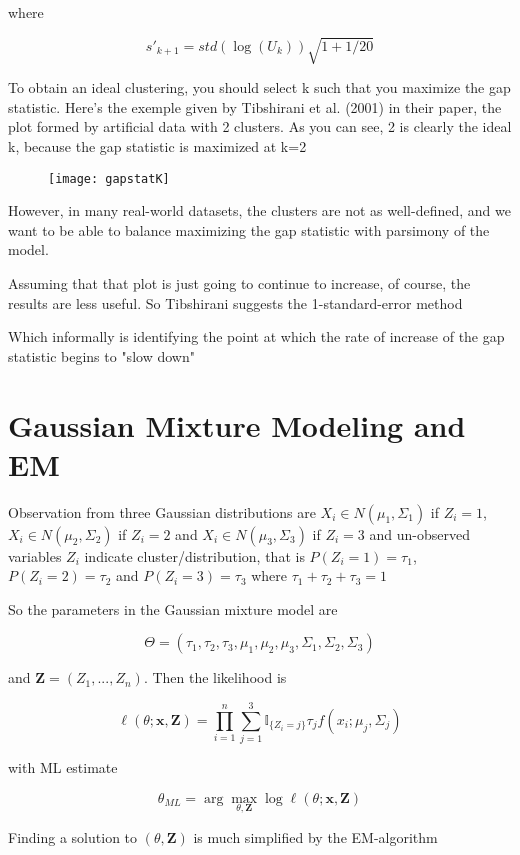 where

\[
    s'_{k+1} = std(\log(U_k)) \sqrt{1 + 1/20}
\]

To obtain an ideal clustering, you should select k such that you maximize the gap statistic. Here's the exemple given by Tibshirani et al. (2001) in their paper, the plot formed by artificial data with 2 clusters. As you can see, 2 is clearly the ideal k, because the gap statistic is maximized at k=2

\begin{figure}
  \centering
  \texttt{[image: gapstatK]}
\end{figure}

However, in many real-world datasets, the clusters are not as well-defined, and we want to be able to balance maximizing the gap statistic with parsimony of the model.

Assuming that that plot is just going to continue to increase, of course, the results are less useful. So Tibshirani suggests the 1-standard-error method

Which informally is identifying the point at which the rate of increase of the gap statistic begins to "slow down"

\section{Gaussian Mixture Modeling and EM}

Observation from three Gaussian distributions are $X_i \in N(\mu_1, \Sigma_1)$ if $Z_i = 1$, $X_i \in N(\mu_2, \Sigma_2)$ if $Z_i = 2$ and $X_i \in N(\mu_3, \Sigma_3)$ if $Z_i = 3$ and un-observed variables $Z_i$ indicate cluster/distribution, that is $P(Z_i=1) = \tau_1$, $P(Z_i=2) = \tau_2$ and $P(Z_i=3) = \tau_3$ where $\tau_1 + \tau_2 + \tau_3 = 1$

So the parameters in the Gaussian mixture model are

\[
    \Theta = (\tau_1, \tau_2, \tau_3, \mu_1, \mu_2, \mu_3, \Sigma_1, \Sigma_2, \Sigma_3)
\]

and $\bm{Z} = (Z_1, ..., Z_n)$. Then the likelihood is

\[
    \ell (\theta; \bm{x}, \bm{Z}) = \prod_{i=1}^{n} \sum_{j=1}^{3} \mathbb{I}_{\{Z_i = j\}} \tau_j f(x_i; \mu_j, \Sigma_j)
\]

with ML estimate

\[
    \theta_{ML} = \arg \max\limits_{\theta, \bm{Z}} \log \ell (\theta; \bm{x}, \bm{Z})
\]

Finding a solution to $(\theta, \bm{Z})$ is much simplified by the EM-algorithm

